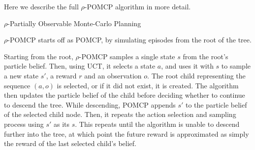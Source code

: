 Here we describe the full $\rho$-POMCP algorithm in more detail.



\begin{algorithm}[H]
    \caption{$\rho$-Partially Observable Monte-Carlo Planning}
\begin{multicols}{2}


    \setcounter{AlgoLine}{0}
\end{multicols}
\end{algorithm}

$\rho$-POMCP starts off as POMCP, by simulating episodes from the root of the tree.

Starting from the root, $\rho$-POMCP samples a single state $s$ from the root's particle belief.
Then, using UCT, it selects a state $a$, and uses it with $s$ to sample a new state $s'$, a reward
$r$ and an observation $o$. The root child representing the sequence $(a,o)$ is selected, or if it
did not exist, it is created. The algorithm then updates the particle belief of the child before
deciding whether to continue to descend the tree. While descending, POMCP appends $s'$ to the
particle belief of the selected child node. Then, it repeats the action selection and sampling
process using $s'$ as its $s$. This repeats until the algorithm is unable to descend further into
the tree, at which point the future reward is approximated as simply the reward of the last
selected child's belief.

